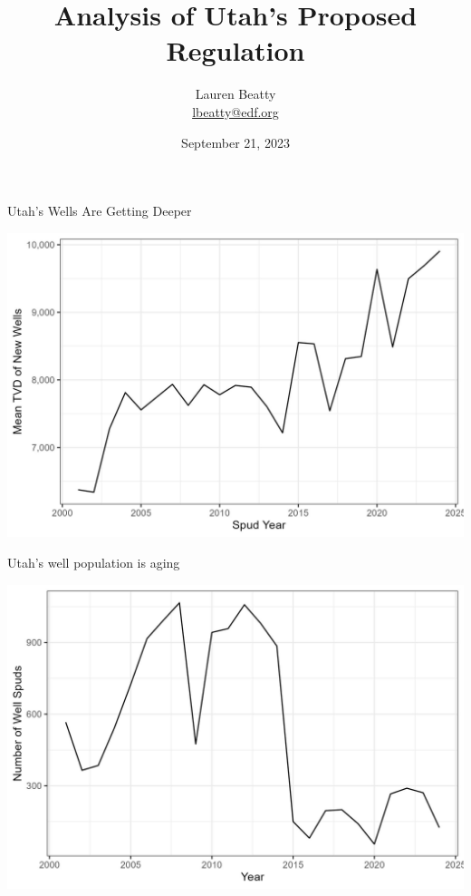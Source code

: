 \documentclass{beamer}
\title{Analysis of Utah's Proposed Regulation}
\author{Lauren Beatty\\ \href{mailto:lbeatty@edf.org}{lbeatty@edf.org}}
\institute{Environmental Defense Fund}
\date{September 21, 2023}
\begin{document}
\frame{\titlepage}

\begin{frame}{Utah's Wells Are Getting Deeper}

\includegraphics[width=\textwidth]{Figures/NewWellsDepth.jpg}
    
\end{frame}


\begin{frame}{Utah's well population is aging}

\includegraphics[width=\textwidth]{Figures/NewWellsTimeseries.jpg}
    
\end{frame}
\end{document}
